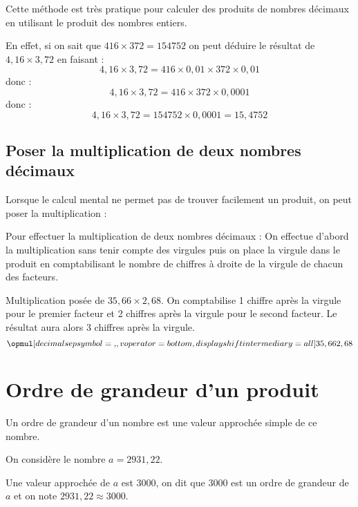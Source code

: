 \documentclass[a4paper,dvipsnames]{article}
\begin{document}
\begin{Ex}
Cette méthode est très pratique pour calculer des produits de nombres décimaux en utilisant le produit des nombres entiers.

En effet, si on sait que  $416\times372=154752$ on peut déduire le résultat de $4,16\times3,72$ en faisant :
\[4,16\times3,72=416\times
0,01\times372\times0,01\]
donc : \[4,16\times3,72=416\times372\times0,0001\]
donc :
\[4,16\times3,72=154752\times0,0001=15,4752\]
\end{Ex}

\subsection{Poser la multiplication de deux nombres décimaux}

\begin{Mt}
Lorsque le calcul mental ne permet pas de trouver facilement un produit, on peut poser la multiplication :

Pour effectuer la multiplication de deux nombres décimaux : On effectue d'abord la multiplication sans tenir compte des virgules puis on place la virgule dans le produit en comptabilisant le nombre de chiffres à droite de la virgule de chacun des facteurs.
\end{Mt}

\begin{Ex}
Multiplication posée de $35,66\times2,68$. On comptabilise 1 chiffre après la virgule pour le premier facteur et 2 chiffres après la virgule pour le second facteur. Le résultat aura alors 3 chiffres après la virgule.
\[\opmul[decimalsepsymbol={,},
voperator=bottom,
displayshiftintermediary=all]{35,66}{2,68}\]
\end{Ex} 

\section{Ordre de grandeur d'un produit}

\begin{Def}
Un ordre de grandeur d'un nombre est une valeur approchée simple de ce nombre.
\end{Def}

\begin{Ex}
On considère le nombre $a=2931,22$.

Une valeur approchée de $a$ est $3000$, on dit que $3000$ est un ordre de grandeur de $a$ et on note $2931,22\approx3000$.
\end{Ex}
\end{document}
